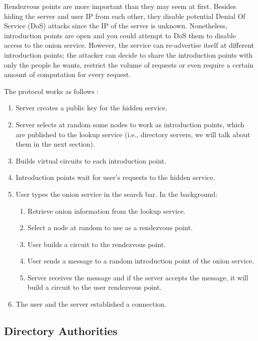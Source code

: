 \documentclass[11pt, a4paper,twoside]{tesi_upf}
\begin{document}
Rendezvous points are more important than they may seem at first. Besides hiding the server and user IP from each other, they disable potential Denial Of Service (DoS) attacks since the IP of the server is unknown. Nonetheless, introduction points are open and you could attempt to DoS them to disable access to the onion service. However, the service can re-advertise itself at different introduction points; the attacker can decide to share the introduction points with only the people he wants, restrict the volume of requests or even require a certain amount of computation for every request.

The protocol works as follows \cite{tor-whitepaper}:

\begin{enumerate}
    \item Server creates a public key for the hidden service.
    \item Server selects at random some nodes to work as introduction points, which are published to the lookup service (i.e., directory servers, we will talk about them in the next section).
    \item Builds virtual circuits to each introduction point. \item Introduction points wait for user's requests to the hidden service.
    \item User types the onion service in the search bar. In the background:
    \begin{enumerate}
        \item Retrieve onion information from the lookup service.
        \item Select a node at random to use as a rendezvous point.
        \item User builds a circuit to the rendezvous point.
        \item User sends a message to a random introduction point of the onion service.
        \item Server receives the message and if the server accepts the message, it will build a circuit to the user rendezvous point.
    \end{enumerate}
    \item The user and the server established a connection.
\end{enumerate}

\subsection{Directory Authorities}
\end{document}
